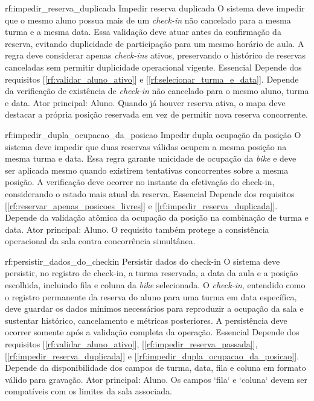 \reqfuncfull
{rf:impedir_reserva_duplicada}
{Impedir reserva duplicada}
{O sistema deve impedir que o mesmo aluno possua mais de um \textit{check-in} não cancelado para a mesma turma e a mesma data. Essa validação deve atuar antes da confirmação da reserva, evitando duplicidade de participação para um mesmo horário de aula. A regra deve considerar apenas \textit{check-ins} ativos, preservando o histórico de reservas canceladas sem permitir duplicidade operacional vigente.}
{Essencial}
{Depende dos requisitos [\ref{rf:validar_aluno_ativo}] e [\ref{rf:selecionar_turma_e_data}]. Depende da verificação de existência de \textit{check-in} não cancelado para o mesmo aluno, turma e data.}
{Ator principal: Aluno. Quando já houver reserva ativa, o mapa deve destacar a própria posição reservada em vez de permitir nova reserva concorrente.}

\reqfuncfull
{rf:impedir_dupla_ocupacao_da_posicao}
{Impedir dupla ocupação da posição}
{O sistema deve impedir que duas reservas válidas ocupem a mesma posição na mesma turma e data. Essa regra garante unicidade de ocupação da \textit{bike} e deve ser aplicada mesmo quando existirem tentativas concorrentes sobre a mesma posição. A verificação deve ocorrer no instante da efetivação do check-in, considerando o estado mais atual da reserva.}
{Essencial}
{Depende dos requisitos [\ref{rf:reservar_apenas_posicoes_livres}] e [\ref{rf:impedir_reserva_duplicada}]. Depende da validação atômica da ocupação da posição na combinação de turma e data.}
{Ator principal: Aluno. O requisito também protege a consistência operacional da sala contra concorrência simultânea.}

\reqfuncfull
{rf:persistir_dados_do_checkin}
{Persistir dados do check-in}
{O sistema deve persistir, no registro de check-in, a turma reservada, a data da aula e a posição escolhida, incluindo fila e coluna da \textit{bike} selecionada. O \textit{check-in}, entendido como o registro permanente da reserva do aluno para uma turma em data específica, deve guardar os dados mínimos necessários para reproduzir a ocupação da sala e sustentar histórico, cancelamento e métricas posteriores. A persistência deve ocorrer somente após a validação completa da operação.}
{Essencial}
{Depende dos requisitos [\ref{rf:validar_aluno_ativo}], [\ref{rf:impedir_reserva_passada}], [\ref{rf:impedir_reserva_duplicada}] e [\ref{rf:impedir_dupla_ocupacao_da_posicao}]. Depende da disponibilidade dos campos de turma, data, fila e coluna em formato válido para gravação.}
{Ator principal: Aluno. Os campos `fila` e `coluna` devem ser compatíveis com os limites da sala associada.}

